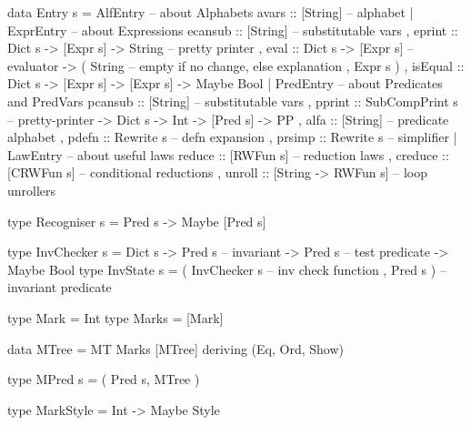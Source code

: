 \begin{code}
data Entry s =
   AlfEntry {   -- about Alphabets
    avars   :: [String]  -- alphabet
   }
 | ExprEntry { -- about Expressions
     ecansub :: [String]                   -- substitutable vars
   , eprint  :: Dict s -> [Expr s] -> String   -- pretty printer
   , eval    :: Dict s -> [Expr s]                  -- evaluator
             -> ( String -- empty if no change, else explanation
                , Expr s )
   , isEqual :: Dict s -> [Expr s] -> [Expr s] -> Maybe Bool
   }
 | PredEntry {    -- about Predicates and PredVars
     pcansub :: [String]                   -- substitutable vars
   , pprint  :: SubCompPrint s                 -- pretty-printer
             -> Dict s -> Int -> [Pred s]
             -> PP
   , alfa :: [String]                      -- predicate alphabet
   , pdefn   :: Rewrite s                      -- defn expansion
   , prsimp  :: Rewrite s                          -- simplifier
   }
 | LawEntry {  -- about useful laws
     reduce  :: [RWFun s]            -- reduction laws
   , creduce :: [CRWFun s]           -- conditional reductions
   , unroll  :: [String -> RWFun s]  -- loop unrollers
   }
\end{code}

\begin{code}
type Recogniser s = Pred s -> Maybe [Pred s]
\end{code}

\begin{code}
type InvChecker s
 = Dict s
   -> Pred s     -- invariant
   -> Pred s     -- test predicate
   -> Maybe Bool
type InvState s
 = ( InvChecker s  -- inv check function
   , Pred s )      -- invariant predicate
\end{code}


\newpage
{}


\begin{code}
type Mark = Int
type Marks = [Mark]
\end{code}

\begin{code}
data MTree = MT Marks [MTree] deriving (Eq, Ord, Show)
\end{code}

\begin{code}
type MPred s = ( Pred s, MTree )
\end{code}

\begin{code}
type MarkStyle = Int -> Maybe Style
\end{code}

